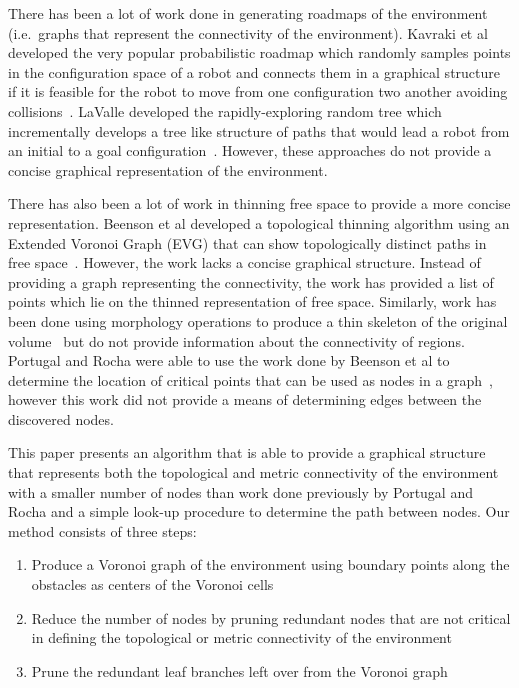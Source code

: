 \documentclass[letterpaper, 10pt, conference]{ieeeconf}
\begin{document}
There has been a lot of work done in generating roadmaps of the environment
(i.e.\ graphs that represent the connectivity of the environment). Kavraki et
al developed the very popular probabilistic roadmap which randomly samples
points in the configuration space of a robot and connects them in a graphical
structure if it is feasible for the robot to move from one configuration two
another avoiding collisions~\cite{prm}. LaValle developed the rapidly-exploring
random tree which incrementally develops a tree like structure of paths that
would lead a robot from an initial to a goal configuration~\cite{rrt}. However,
these approaches do not provide a concise graphical representation of the
environment.

There has also been a lot of work in thinning free space to provide a more
concise representation. Beenson et al developed a topological thinning
algorithm using an Extended Voronoi Graph (EVG) that can show topologically
distinct paths in free space~\cite{evg}. However, the work lacks a concise
graphical structure.  Instead of providing a graph representing the
connectivity, the work has provided a list of points which lie on the thinned
representation of free space. Similarly, work has been done using morphology
operations to produce a thin skeleton of the original
volume~\cite{graphicsGems,skeletonize3d} but do not provide information about
the connectivity of regions. Portugal and Rocha were able to use the work done
by Beenson et al to determine the location of critical points that can be used
as nodes in a graph~\cite{david}, however this work did not provide a means of
determining edges between the discovered nodes.

This paper presents an algorithm that is able to provide a graphical structure
that represents both the topological and metric connectivity of the environment
with a smaller number of nodes than work done previously by Portugal and Rocha
and a simple look-up procedure to determine the path between nodes. Our method
consists of three steps:

\begin{enumerate}
    \item Produce a Voronoi graph of the environment using boundary points
        along the obstacles as centers of the Voronoi cells
    \item Reduce the number of nodes by pruning redundant nodes that are not
        critical in defining the topological or metric connectivity of the
        environment
    \item Prune the redundant leaf branches left over from the Voronoi
        graph
\end{enumerate}
\end{document}
